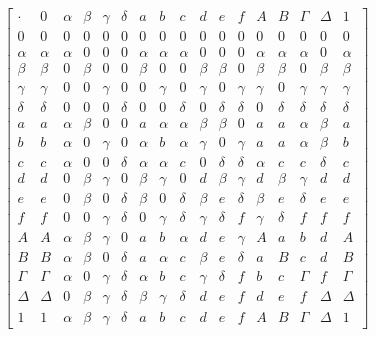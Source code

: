 \[\begin{bmatrix}
 \cdot & 0 & \alpha & \beta & \gamma & \delta & a & b & c & d & e & f & Α & Β & \Gamma & \Delta & 1 \\
0 & 0 & 0 & 0 & 0 & 0 & 0 & 0 & 0 & 0 & 0 & 0 & 0 & 0 & 0 & 0 & 0 \\
\alpha & \alpha & \alpha & 0 & 0 & 0 & \alpha & \alpha & \alpha & 0 & 0 & 0 & \alpha & \alpha & \alpha & 0 & \alpha \\
\beta & \beta & 0 & \beta & 0 & 0 & \beta & 0 & 0 & \beta & \beta & 0 & \beta & \beta & 0 & \beta & \beta \\
\gamma & \gamma & 0 & 0 & \gamma & 0 & 0 & \gamma & 0 & \gamma & 0 & \gamma & \gamma & 0 & \gamma & \gamma & \gamma \\
\delta & \delta & 0 & 0 & 0 & \delta & 0 & 0 & \delta & 0 & \delta & \delta & 0 & \delta & \delta & \delta & \delta \\
a & a & \alpha & \beta & 0 & 0 & a & \alpha & \alpha & \beta & \beta & 0 & a & a & \alpha & \beta & a \\
b & b & \alpha & 0 & \gamma & 0 & \alpha & b & \alpha & \gamma & 0 & \gamma & a & a & \alpha & \beta & b \\
c & c & \alpha & 0 & 0 & \delta & \alpha & \alpha & c & 0 & \delta & \delta & \alpha & c & c & \delta & c \\
d & d & 0 & \beta & \gamma & 0 & \beta & \gamma & 0 & d & \beta & \gamma & d & \beta & \gamma & d & d \\
e & e & 0 & \beta & 0 & \delta & \beta & 0 & \delta & \beta & e & \delta & \beta & e & \delta & e & e \\
f & f & 0 & 0 & \gamma & \delta & 0 & \gamma & \delta & \gamma & \delta & f & \gamma & \delta & f & f & f \\
Α & Α & \alpha & \beta & \gamma & 0 & a & b & \alpha & d & e & \gamma & Α & a & b & d & Α \\
Β & Β & \alpha & \beta & 0 & \delta & a & \alpha & c & \beta & e & \delta & a & Β & c & d & Β \\
\Gamma & \Gamma & \alpha & 0 & \gamma & \delta & \alpha & b & c & \gamma & \delta & f & b & c & \Gamma & f & \Gamma \\
\Delta & \Delta & 0 & \beta & \gamma & \delta & \beta & \gamma & \delta & d & e & f & d & e & f & \Delta & \Delta \\
1 & 1 & \alpha & \beta & \gamma & \delta & a & b & c & d & e & f & Α & Β & \Gamma & \Delta & 1
\end{bmatrix}\]

